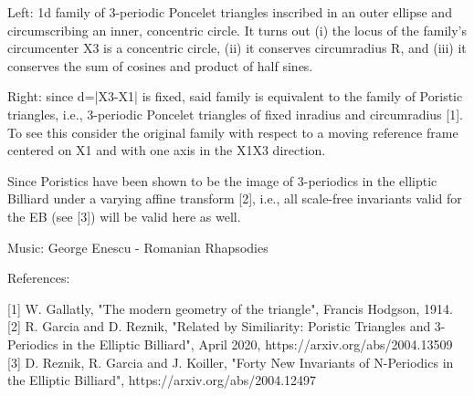 Left: 1d family of 3-periodic Poncelet triangles inscribed in an outer ellipse and circumscribing an inner, concentric circle. It turns out (i) the locus of the family's circumcenter X3 is a concentric circle, (ii) it conserves circumradius R, and (iii) it conserves the sum of cosines and product of half sines.

Right: since d=|X3-X1| is fixed, said family is equivalent to the family of Poristic triangles, i.e., 3-periodic Poncelet triangles of fixed inradius and circumradius [1]. To see this consider the original family with respect to a moving reference frame centered on X1 and with one axis in the X1X3 direction.

Since Poristics have been shown to be the image of 3-periodics in the elliptic Billiard under a varying affine transform [2], i.e., all scale-free invariants valid for the EB (see [3]) will be valid here as well.

Music: George Enescu - Romanian Rhapsodies

References:

[1] W. Gallatly, "The modern geometry of the triangle", Francis Hodgson, 1914.
[2] R. Garcia and D. Reznik, "Related by Similiarity: Poristic Triangles and 3-Periodics in the Elliptic Billiard", April 2020, https://arxiv.org/abs/2004.13509
[3] D. Reznik, R. Garcia and J. Koiller, "Forty New Invariants of N-Periodics in the Elliptic Billiard", https://arxiv.org/abs/2004.12497